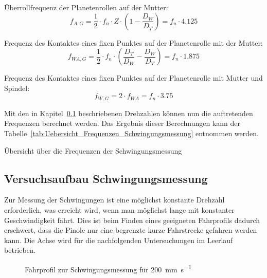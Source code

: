 Überrollfrequenz der Planetenrollen auf der Mutter:
\begin{equation}
f_{A, G} = \frac{1}{2} \cdot f_{n} \cdot Z \cdot \left( 1-\frac{D_{W}}{D_{T}} \right) = f_{n} \cdot \num{4.125}
\end{equation}


Frequenz des Kontaktes eines fixen Punktes auf der Planetenrolle mit der Mutter:
\begin{equation}
f_{WA, G} = \frac{1}{2} \cdot f_{n} \cdot \left( \frac{D_{T}}{D_{W}}-\frac{D_{W}}{D_{T}} \right) = f_{n} \cdot \num{1.875}
\end{equation}

Frequenz des Kontaktes eines fixen Punktes auf der Planetenrolle mit Mutter und Spindel:
\begin{equation}
f_{W, G} = 2 \cdot f_{WA} = f_{n} \cdot \num{3.75}
\end{equation}


Mit den in Kapitel~\ref{cha:Versuchsaufbau_Schwingungsmessung} beschriebenen Drehzahlen können nun die auftretenden Frequenzen berechnet werden. Das Ergebnis dieser Berechnungen kann der Tabelle~\ref{tab:Uebersicht_Frequenzen_Schwingungsmessung} entnommen werden.

\begin{table}[h]
\centering

\caption{Übersicht über die Frequenzen der Schwingungsmessung}
\label{tab:Uebersicht_Frequenzen_Schwingungsmessung}
\end{table}


\subsection{Versuchsaufbau Schwingungsmessung}\label{cha:Versuchsaufbau_Schwingungsmessung}

Zur Messung der Schwingungen ist eine möglichst konstante Drehzahl erforderlich, was erreicht wird, wenn man möglichst lange mit konstanter Geschwindigkeit fährt. Dies ist beim Finden eines geeigneten Fahrprofils dadurch erschwert, dass die Pinole nur eine begrenzte kurze Fahrstrecke gefahren werden kann. Die Achse wird für die nachfolgenden Untersuchungen im Leerlauf betrieben.


\begin{figure}[H]
\centering

\caption{Fahrprofil zur Schwingungsmessung für \SI{200}{\milli\meter\per\second}}
\label{fig:Schwingungsmessung_Fahrprofil}
\end{figure}


